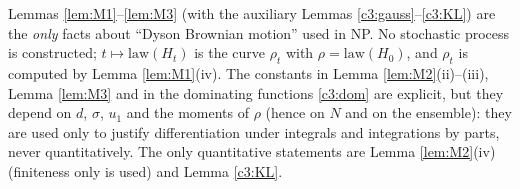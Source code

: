 \begin{remark}\label{rem:M4}
Lemmas \ref{lem:M1}--\ref{lem:M3} (with the auxiliary Lemmas \ref{c3:gauss}--\ref{c3:KL}) are the \emph{only} facts about ``Dyson Brownian motion'' used in NP. No stochastic process is constructed; $t\mapsto\mathrm{law}(H_t)$ is the curve $\rho_t$ with $\rho=\mathrm{law}(H_0)$, and $\rho_t$ is computed by Lemma \ref{lem:M1}(iv).
The constants in Lemma \ref{lem:M2}(ii)--(iii), Lemma \ref{lem:M3} and in the dominating functions \eqref{c3:dom} are explicit, but they depend on $d$, $\sigma$, $u_1$ and the moments of $\rho$ (hence on $N$ and on the ensemble): they are used only to justify differentiation under integrals and integrations by parts, never quantitatively. The only quantitative statements are Lemma \ref{lem:M2}(iv) (finiteness only is used) and Lemma \ref{c3:KL}.
\end{remark}
